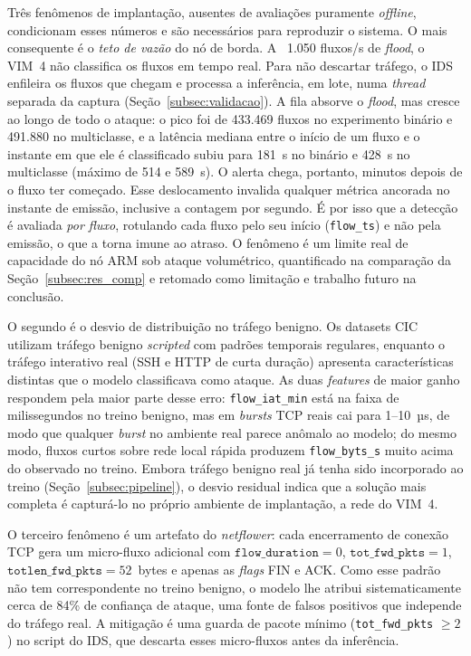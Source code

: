 \documentclass[12pt,a4paper]{article}
\begin{document}
Três fenômenos de implantação, ausentes de avaliações puramente \textit{offline},
condicionam esses números e são necessários para reproduzir o sistema. O mais
consequente é o \emph{teto de vazão} do nó de borda. A ~1.050 fluxos/s de
\textit{flood}, o VIM~4 não classifica os fluxos em tempo real. Para não descartar
tráfego, o IDS enfileira os fluxos que chegam e processa a inferência, em lote,
numa \textit{thread} separada da captura (Seção~\ref{subsec:validacao}). A fila
absorve o \textit{flood}, mas cresce ao longo de todo o ataque: o pico foi de
433.469 fluxos no experimento binário e 491.880 no multiclasse, e a latência
mediana entre o início de um fluxo e o instante em que ele é classificado subiu
para 181~s no binário e 428~s no multiclasse (máximo de 514 e 589~s). O alerta
chega, portanto, minutos depois de o fluxo ter começado. Esse deslocamento
invalida qualquer métrica ancorada no instante de emissão, inclusive a contagem
por segundo. É por isso que a detecção é avaliada \emph{por fluxo}, rotulando cada
fluxo pelo seu início (\texttt{flow\_ts}) e não pela emissão, o que a torna imune
ao atraso. O fenômeno é um limite real de capacidade do nó ARM sob ataque
volumétrico, quantificado na comparação da Seção~\ref{subsec:res_comp} e retomado
como limitação e trabalho futuro na conclusão.

O segundo é o desvio de distribuição no tráfego benigno. Os datasets
CIC utilizam tráfego benigno \textit{scripted} com padrões temporais regulares,
enquanto o tráfego interativo real (SSH e HTTP de curta duração) apresenta
características distintas que o modelo classificava como ataque. As duas
\textit{features} de maior ganho respondem pela maior parte desse erro:
\texttt{flow\_iat\_min} está na faixa de milissegundos no treino benigno, mas em
\textit{bursts} TCP reais cai para 1--10~µs, de modo que qualquer \textit{burst}
no ambiente real parece anômalo ao modelo; do mesmo modo, fluxos curtos sobre
rede local rápida produzem \texttt{flow\_byts\_s} muito acima do observado no
treino. Embora tráfego benigno real já tenha sido incorporado ao treino
(Seção~\ref{subsec:pipeline}), o desvio residual indica que a solução mais
completa é capturá-lo no próprio ambiente de implantação, a rede do VIM~4.

O terceiro fenômeno é um artefato do \textit{netflower}: cada encerramento de
conexão TCP gera um micro-fluxo adicional com $\texttt{flow\_duration} = 0$,
$\texttt{tot\_fwd\_pkts} = 1$, $\texttt{totlen\_fwd\_pkts} = 52$~bytes e apenas
as \textit{flags} FIN e ACK. Como esse padrão não tem correspondente no treino
benigno, o modelo lhe atribui sistematicamente cerca de 84\% de confiança de
ataque, uma fonte de falsos positivos que independe do tráfego real. A mitigação
é uma guarda de pacote mínimo (\texttt{tot\_fwd\_pkts} $\geq 2$) no script do
IDS, que descarta esses micro-fluxos antes da inferência.
\end{document}
